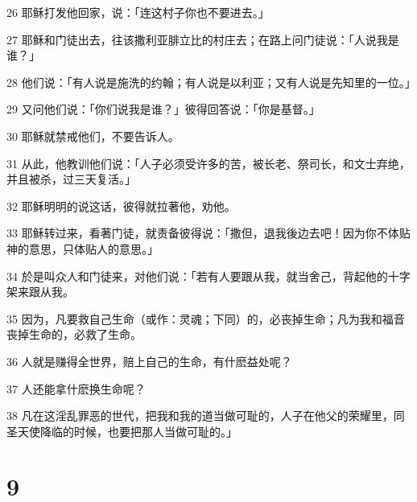 \par 26 耶稣打发他回家，说：「连这村子你也不要进去。」
\par 27 耶稣和门徒出去，往该撒利亚腓立比的村庄去；在路上问门徒说：「人说我是谁？」
\par 28 他们说：「有人说是施洗的约翰；有人说是以利亚；又有人说是先知里的一位。」
\par 29 又问他们说：「你们说我是谁？」彼得回答说：「你是基督。」
\par 30 耶稣就禁戒他们，不要告诉人。
\par 31 从此，他教训他们说：「人子必须受许多的苦，被长老、祭司长，和文士弃绝，并且被杀，过三天复活。」
\par 32 耶稣明明的说这话，彼得就拉著他，劝他。
\par 33 耶稣转过来，看著门徒，就责备彼得说：「撒但，退我後边去吧！因为你不体贴神的意思，只体贴人的意思。」
\par 34 於是叫众人和门徒来，对他们说：「若有人要跟从我，就当舍己，背起他的十字架来跟从我。
\par 35 因为，凡要救自己生命（或作：灵魂；下同）的，必丧掉生命；凡为我和福音丧掉生命的，必救了生命。
\par 36 人就是赚得全世界，赔上自己的生命，有什麽益处呢？
\par 37 人还能拿什麽换生命呢？
\par 38 凡在这淫乱罪恶的世代，把我和我的道当做可耻的，人子在他父的荣耀里，同圣天使降临的时候，也要把那人当做可耻的。」

\chapter{9}

